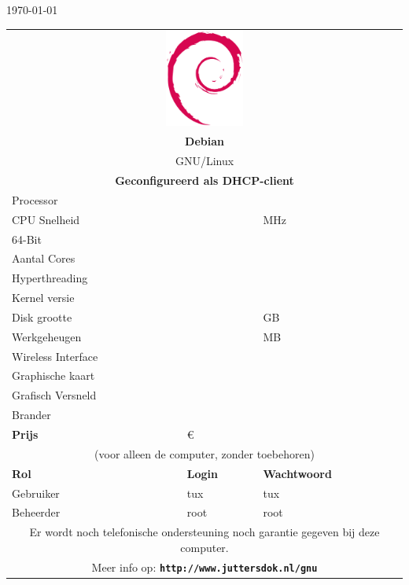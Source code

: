 \documentclass[a4paper,14pt]{extarticle}
\begin{document}

\centerline{\today}
\vskip 0.5cm
\begin{center}
	\begin{tabular}{ |p{6cm}| p{6cm}| l| }
	\multicolumn{3}{c}{\includegraphics[width=0.2\textwidth]{swirl}} \\
	\multicolumn{3}{c}{\Huge\bf{Debian \debiancode{} \debianversion}}\\
	\multicolumn{3}{c}{\LARGE{GNU/Linux}}\\
	\multicolumn{3}{c}{\bf Geconfigureerd als DHCP-client}\\
	\hline
	Processor & \multicolumn{2}{l|}{\cpumodel{}}  \\
	CPU Snelheid & \cpuspeed{} & MHz \\
	64-Bit & \bitssixtyfour{} & \\
	Aantal Cores & \corecount{} & \\
	Hyperthreading & \hyperthreading{} & \\
	Kernel versie & {} & \\
	Disk grootte & \disksize{} & GB \\
	Werkgeheugen & \memsize{} & MB \\
	Wireless Interface & \wireless & \\
	Graphische kaart & \multicolumn{2}{l|}{\graphics{}}  \\
	Grafisch Versneld & \accelerated{} & \\
	Brander &  \burner{} & \\
	\hline
	{\bf Prijs}		& \euro{}{\price{}} &  \\
	\hline
	\multicolumn{3}{|c|}{(voor alleen de computer, zonder toebehoren)}\\
	\hline
	\hline
	\textbf{Rol} & \textbf{Login} & \textbf{Wachtwoord} \\
	\hline
	Gebruiker    & tux            & tux \\
	Beheerder    & root					  & root \\
	\hline
	\multicolumn{3}{c}{Er wordt noch telefonische ondersteuning noch garantie gegeven bij deze computer.}\\
	\multicolumn{3}{c}{Meer info op: \textbf{\texttt{http://www.juttersdok.nl/gnu}}}\\

\end{tabular}
\end{center}
\end{document}
